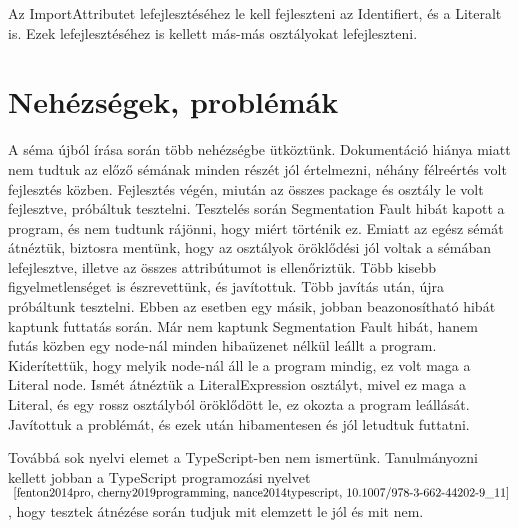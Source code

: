 Az ImportAttributet lefejlesztéséhez le kell fejleszteni az Identifiert, és a Literalt is.
Ezek lefejlesztéséhez is kellett más-más osztályokat lefejleszteni.

\noindent

\section{Nehézségek, problémák}

\noindent

A séma újból írása során több nehézségbe ütköztünk.
Dokumentáció hiánya miatt nem tudtuk az előző sémának minden részét jól értelmezni, néhány félreértés volt fejlesztés közben.
Fejlesztés végén, miután az összes package és osztály le volt fejlesztve, próbáltuk tesztelni.
Tesztelés során Segmentation Fault hibát kapott a program, és nem tudtunk rájönni, hogy miért történik ez.
Emiatt az egész sémát átnéztük, biztosra mentünk, hogy az osztályok öröklődési jól voltak a sémában lefejlesztve, illetve az összes attribútumot is ellenőriztük.
Több kisebb figyelmetlenséget is észrevettünk, és javítottuk.
Több javítás után, újra próbáltunk tesztelni. Ebben az esetben egy másik, jobban beazonosítható hibát kaptunk futtatás során.
Már nem kaptunk Segmentation Fault hibát, hanem futás közben egy node-nál minden hibaüzenet nélkül leállt a program.
Kiderítettük, hogy melyik node-nál áll le a program mindig, ez volt maga a Literal node.
Ismét átnéztük a LiteralExpression osztályt, mivel ez maga a Literal, és egy rossz osztályból öröklődött le, ez okozta a program leállását.
Javítottuk a problémát, és ezek után hibamentesen és jól letudtuk futtatni.

\noindent

Továbbá sok nyelvi elemet a TypeScript-ben nem ismertünk.
Tanulmányozni kellett jobban a TypeScript programozási nyelvet$^{~\cite{fenton2014pro, cherny2019programming, nance2014typescript, 10.1007/978-3-662-44202-9_11}}$, hogy tesztek átnézése során tudjuk mit elemzett le jól és mit nem.
